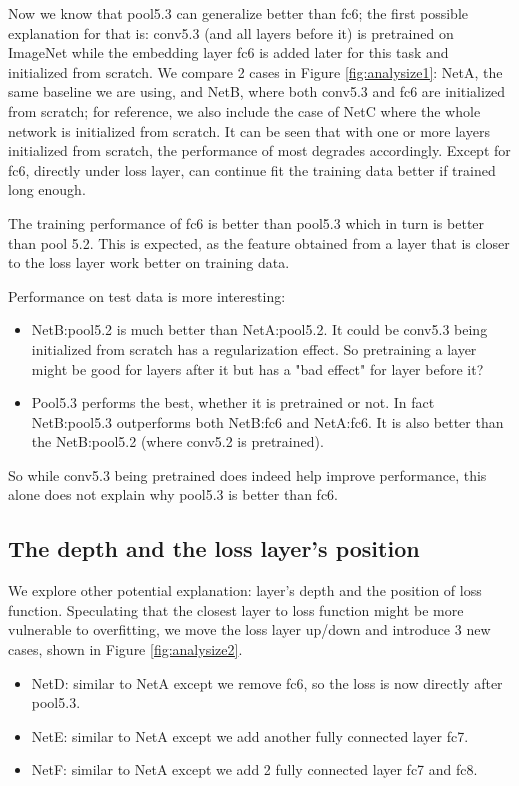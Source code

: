 \documentclass[10pt,twocolumn,letterpaper]{article}
\begin{document}
Now we know that pool5.3 can generalize better than fc6; the first possible explanation for that is: conv5.3 (and all layers before it) is pretrained on ImageNet while the embedding layer fc6 is added later for this task and initialized from scratch. We compare 2 cases in Figure \ref{fig:analysize1}: NetA, the same baseline we are using, and NetB, where both conv5.3 and fc6 are initialized from scratch; for reference, we also include the case of NetC where the whole network is initialized from scratch.
It can be seen that with one or more layers initialized from scratch, the performance of most degrades accordingly. Except for fc6, directly under loss layer, can continue fit the training data better if trained long enough.

The training performance of fc6 is better than pool5.3 which in turn is better than pool 5.2. This is expected, as the feature obtained from a layer that is closer to the loss layer work better on training data.




Performance on test data is more interesting:
\begin{itemize}
  \item NetB:pool5.2 is much better than NetA:pool5.2. It could be conv5.3 being initialized from scratch has a regularization effect. So pretraining a layer might be good for layers after it but has a "bad effect" for layer before it?
  \item Pool5.3 performs the best, whether it is pretrained or not. In fact NetB:pool5.3 outperforms both NetB:fc6 and NetA:fc6. It is also better than the NetB:pool5.2 (where conv5.2 is pretrained).
\end{itemize}

So while conv5.3 being pretrained does indeed help improve performance, this alone does not explain why pool5.3 is better than fc6.



\subsection{The depth and the loss layer's position}


We explore other potential explanation: layer's depth and the position of loss function. Speculating that the closest layer to loss function might be more vulnerable to overfitting, we move the loss layer up/down and introduce 3 new cases, shown in Figure \ref{fig:analysize2}.
\begin{itemize}
  \item NetD: similar to NetA except we remove fc6, so the loss is now directly after pool5.3.
  \item NetE: similar to NetA except we add another fully connected layer fc7.
  \item NetF: similar to NetA except we add 2 fully connected layer fc7 and fc8.
\end{itemize}
\end{document}
